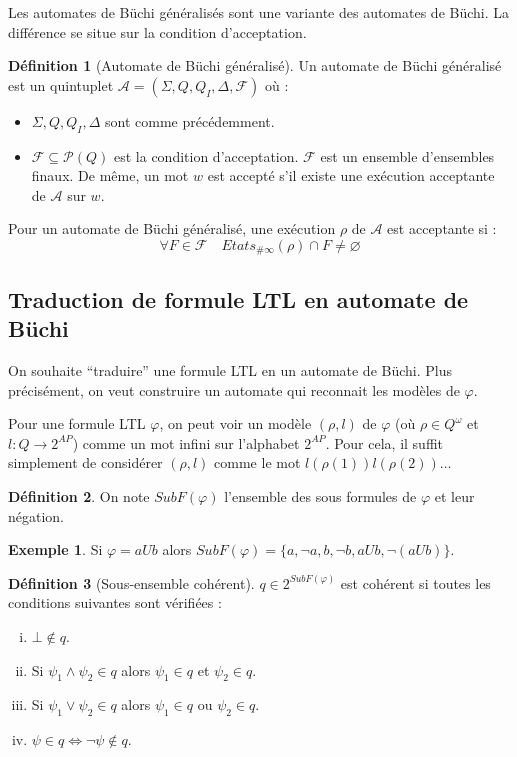 \documentclass[12pt,a4paper]{article}
\theoremstyle{plain}
\theoremstyle{definition}
\newtheorem{defi}{Définition}
\newtheorem{ex}{Exemple}
\begin{document}
Les automates de Büchi généralisés sont une variante des automates de Büchi.
La différence se situe sur la condition d'acceptation.
\begin{defi}[Automate de Büchi généralisé]
  Un automate de Büchi généralisé est un quintuplet $\mathcal{A}=(\Sigma, Q, Q_I, \Delta, \mathscr{F})$ où :
  \begin{itemize}
  \item $\Sigma, Q, Q_I, \Delta$ sont comme précédemment.
  \item $\mathscr{F} \subseteq \mathcal{P}(Q)$ est la condition d'acceptation.
    $\mathscr{F}$ est un ensemble d'ensembles finaux. De même, un mot $w$ est accepté s'il existe une exécution acceptante de $\mathcal{A}$ sur $w$.
  \end{itemize}
  
\end{defi}
Pour un automate de Büchi généralisé, une exécution $\rho$ de $\mathcal{A}$ est acceptante si :
\[
  \forall F \in \mathscr{F} \quad Etats_{\#\infty}(\rho) \cap F \neq \varnothing
\]

\subsection{Traduction de formule LTL en automate de Büchi}
On souhaite ``traduire'' une formule LTL en un automate de Büchi.
Plus précisément, on veut construire un automate qui reconnait les modèles de $\varphi$.

Pour une formule LTL $\varphi$, on peut voir un modèle $(\rho, l)$ de $\varphi$ (où $\rho \in Q^\omega$ et $l : Q \to 2^{AP}$) comme un mot infini sur l'alphabet $2^{AP}$.
Pour cela, il suffit simplement de considérer $(\rho, l)$ comme le mot $l(\rho(1))l(\rho(2))\dots$


\begin{defi}
  On note $SubF(\varphi)$ l'ensemble des sous formules de $\varphi$ et leur négation.
\end{defi}

\begin{ex}
  Si $\varphi = a U b$ alors $SubF(\varphi) = \{ a, \lnot a, b, \lnot b, a U b, \lnot(a U b)\}$.
\end{ex}

\begin{defi}[Sous-ensemble cohérent]
  $q \in 2^{SubF(\varphi)}$ est cohérent si toutes les conditions suivantes sont vérifiées :
  \begin{enumerate}[(i)]
  \item $\bot \not \in q$.
  \item Si $\psi_1 \land \psi_2 \in q$ alors $\psi_1 \in q$ et $\psi_2 \in q$.
  \item Si $\psi_1 \lor \psi_2 \in q$ alors $\psi_1 \in q$ ou $\psi_2 \in q$.
  \item $\psi \in q \iff \lnot \psi \not\in q$.
  \end{enumerate}
\end{defi}
\end{document}
